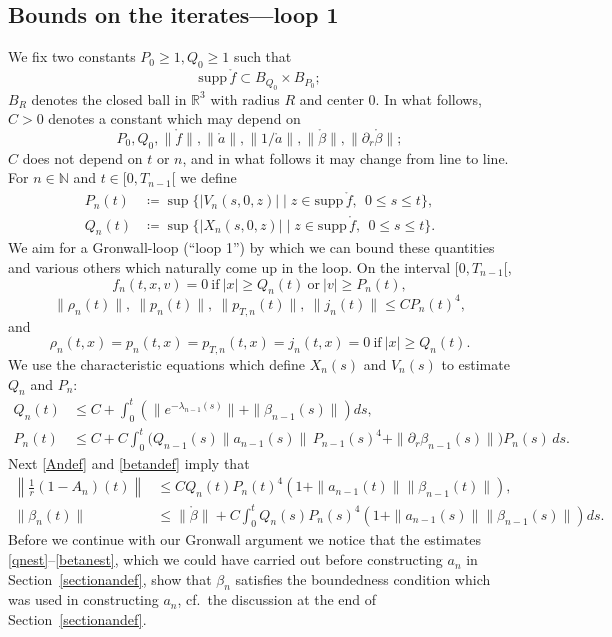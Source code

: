 \documentclass[11pt]{article}
\def\R{\mathbb R}
\def\N{\mathbb N}
\def\supp{\mathrm{supp}\,}
\begin{document}
\subsection{Bounds on the iterates---loop 1}\label{loop1}
%
%
We fix two constants $P_0\geq 1, Q_0\geq 1$ such that
\[
\supp \mathring{f} \subset B_{Q_0}\times B_{P_0};
\]
$B_R$ denotes the closed ball in $\R^3$ with radius $R$ and center $0$.
In what follows, $C>0$ denotes a constant which may depend on
\[
P_0, Q_0, \|\mathring{f}\|, \|\mathring{a}\|, \|1/\mathring{a}\|,
\|\mathring{\beta}\|, \|\partial_r\mathring{ \beta}\|;
\]
$C$ does not depend on $t$ or $n$, and in what
follows it may change from line to line.
For $n\in \N$ and $t\in [0,T_{n-1}[$ we define
\begin{align}
  P_n(t)
  &\coloneqq
  \sup\bigl\{|V_n(s,0,z)| \mid z\in \supp \mathring{f},\
  \ 0 \leq s\leq t\bigr\},
  \label{Pn-def}\\
  Q_n(t)
  &\coloneqq
  \sup\bigl\{|X_n(s,0,z)| \mid z\in \supp \mathring{f},
  \ \ 0 \leq s\leq t\bigr\}.
  \label{qn-def}
\end{align}
We aim for a Gronwall-loop (``loop 1'') by which we can bound these
quantities and various others which naturally come up in the loop.
On the interval $[0,T_{n-1}[$,
\[
f_n(t,x,v) = 0\ \mbox{if}\ |x|\geq Q_n(t)\ \mbox{or}\ |v| \geq P_n(t),
\]
\[
\|\rho_n(t)\|,\ \|p_n(t)\|,\  \|p_{T,n}(t)\|,\  \|j_n(t)\| \leq
C P_n(t)^4,
\]
and
\[
\rho_n(t,x)=p_n(t,x)=p_{T,n}(t,x)=j_n(t,x)=0\ \mbox{if}\ |x|\geq Q_n(t).
\]
We use the characteristic equations
which define $X_n(s)$ and $V_n(s)$ to estimate $Q_n$ and $P_n$:
\begin{align}
  Q_n(t)
  &\leq C + \int_0^t \left(\|e^{-\lambda_{n-1}(s)}\| + \|\beta_{n-1}(s)\|\right) ds,
  \label{qnest}\\
  P_n(t)
  &\leq C + C \int_0^t
  \bigl(Q_{n-1}(s) \|a_{n-1}(s)\|\, P_{n-1}(s)^4
  + \|\partial_r\beta_{n-1}(s)\|\bigr) P_n(s)\, ds .
  \label{pnest}
\end{align}
Next \eqref{Andef} and \eqref{betandef} imply that
\begin{align}
  \left\|\frac{1}{r} ( 1-A_n)(t)\right\|
  &\leq
  C Q_n(t) P_n(t)^4 \left(1+\|a_{n-1}(t)\| \|\beta_{n-1}(t)\|\right),
  \label{Anest}\\
  \|\beta_n(t)\|
  &\leq \|\mathring{\beta}\| +
  C \int_0^t Q_n(s) P_n(s)^4 \left(1+\|a_{n-1}(s)\| \|\beta_{n-1}(s)\|\right) ds.
  \label{betanest}
\end{align}
Before we continue with our Gronwall argument we notice that the estimates
\eqref{qnest}--\eqref{betanest},
which we could have carried out before constructing
$a_n$ in Section~\ref{sectionandef}, show that $\beta_n$
satisfies the boundedness condition
which was used in constructing $a_n$, cf.~the discussion
at the end of Section~\ref{sectionandef}.
\end{document}

